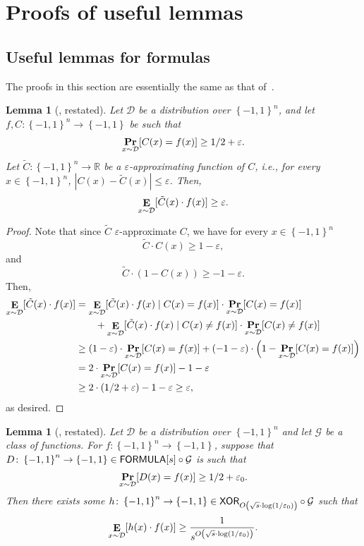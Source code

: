 \documentclass[10pt,a4paper]{article}
\newtheorem{lemma}[theorem]{Lemma}
\DeclareMathOperator*\Exp{{\bf E}}
\DeclareMathOperator*\Prob{{\bf Pr}}
\newcommand{\boolpm}{\left\{-1,1\right\}}
\newcommand{\FORMULA}{{\sf FORMULA}}
\newcommand{\XOR}{{\sf XOR}}
\newcommand{\given}{\mid}
\newcommand{\real}{\mathbb{R}}
\begin{document}
\appendix
\setcounter{theorem}{49}
    \section{Proofs of useful lemmas}
    
    \subsection{Useful lemmas for formulas}\label{subsec:formula-lemmas}
    
    The proofs in this section are essentially the same as that of~\cite{Tal16}.
    
    \begin{lemma}[\cite{Tal16},  restated]\label{lem:lb-Tal-1-app}
	    Let $\mathcal{D}$ be a distribution over $\boolpm^n$, and let $f,C\colon\boolpm^n\to\boolpm$ be such that
	    \[
	        \Prob_{x\sim\mathcal{D}}[C(x)=f(x)]\geq 1/2+\varepsilon.
	    \] 
	    Let $\tilde{C}\colon\boolpm^n\to\real$ be a $\varepsilon$-approximating function of $C$, i.e., for every $x\in\boolpm^n$, $|C(x)-\tilde{C}(x)|\leq \varepsilon$. Then,
	    \[
	        \Exp_{x\sim\mathcal{D}}[\tilde{C}(x)\cdot f(x)]\geq \varepsilon.
	    \]
	\end{lemma}
	
	\begin{proof}
		Note that since $\tilde{C}$ $\varepsilon$-approximate $C$, we have for every $x\in\boolpm^n$
		\[
			\tilde{C}\cdot C(x)\geq 1-\varepsilon,
		\]
		and 
		\[
			\tilde{C}\cdot (1-C(x))\geq -1-\varepsilon.
		\]
		Then,
		\begin{align*}
			\Exp_{x\sim\mathcal{D}}[\tilde{C}(x)\cdot f(x)]&=\Exp_{x\sim\mathcal{D}}[\tilde{C}(x)\cdot f(x)\given C(x)=f(x)]\cdot\Prob_{x\sim\mathcal{D}}[C(x)=f(x)]\\
			&\qquad+\Exp_{x\sim\mathcal{D}}[\tilde{C}(x)\cdot f(x)\given C(x)\ne f(x)]\cdot\Prob_{x\sim\mathcal{D}}[C(x)\ne f(x)]\\
			&\geq(1-\varepsilon)\cdot \Prob_{x\sim\mathcal{D}}[C(x)=f(x)] + (-1-\varepsilon)\cdot \left(1-\Prob_{x\sim\mathcal{D}}[C(x)=f(x)]\right)\\
			&=2\cdot \Prob_{x\sim\mathcal{D}}[C(x)=f(x)] - 1 -\varepsilon\\
			&\geq 2\cdot (1/2+\varepsilon) - 1 - \varepsilon \geq \varepsilon,
		\end{align*}
		as desired.
	\end{proof}
	
	\begin{lemma}[\cite{Tal16},  restated]\label{lem:lb-Tal-2-app}
	    Let $\mathcal{D}$ be a distribution over $\boolpm^n$ and let $\mathcal{G}$ be a class of functions. For $f\colon\boolpm^n\to\boolpm$, suppose that $D\colon\boolpm^n\to\boolpm\in \FORMULA[s]\circ\mathcal{G}$ is such that 
	    \[
	        \Prob_{x\sim\mathcal{D}}[D(x)=f(x)]\geq 1/2+\varepsilon_0.
	    \]
	    Then there exists some $h\colon\boolpm^n\to\boolpm\in \XOR_{O\left(\sqrt{s}\cdot\log(1/\varepsilon_0)\right)}\circ \mathcal{G}$ such that
	    \[
	        \Exp_{x\sim\mathcal{D}}[h(x)\cdot f(x)]\geq \frac{1}{s^{O\left(\sqrt{s}\cdot\log(1/\varepsilon_0)\right)}}.
	    \]
	\end{lemma}
	
\end{document}
